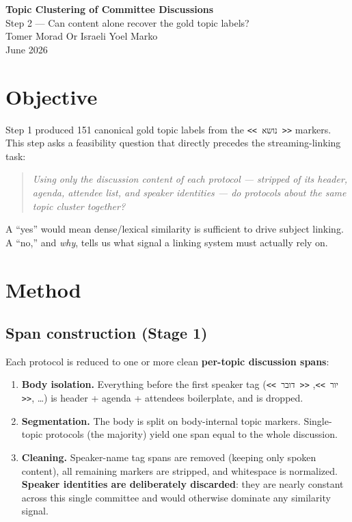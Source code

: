 \documentclass[11pt,a4paper]{article}
\begin{document}
\begin{center}
  {\LARGE \textbf{Topic Clustering of Committee Discussions}}\\[0.3em]
  {\large Step 2 --- Can content alone recover the gold topic labels?}\\[0.6em]
  {\normalsize Tomer Morad \quad Or Israeli \quad Yoel Marko}\\
  {\normalsize June 2026}
\end{center}

\vspace{0.5em}

\section{Objective}

Step 1 produced 151 canonical gold topic labels from the \texttt{<{}< נושא >{}>} markers.
This step asks a feasibility question that directly precedes the streaming-linking task:

\begin{quote}
\emph{Using only the discussion content of each protocol --- stripped of its header, agenda,
attendee list, and speaker identities --- do protocols about the same topic cluster together?}
\end{quote}

A ``yes'' would mean dense/lexical similarity is sufficient to drive subject linking.
A ``no,'' and \emph{why}, tells us what signal a linking system must actually rely on.

\section{Method}

\subsection{Span construction (Stage 1)}

Each protocol is reduced to one or more clean \textbf{per-topic discussion spans}:
\begin{enumerate}[noitemsep]
  \item \textbf{Body isolation.} Everything before the first speaker tag
    (\texttt{<{}< יור >{}>}, \texttt{<{}< דובר >{}>}, \dots) is header + agenda + attendees
    boilerplate, and is dropped.
  \item \textbf{Segmentation.} The body is split on body-internal topic markers. Single-topic
    protocols (the majority) yield one span equal to the whole discussion.
  \item \textbf{Cleaning.} Speaker-name tag spans are removed (keeping only spoken content),
    all remaining markers are stripped, and whitespace is normalized. \textbf{Speaker identities
    are deliberately discarded}: they are nearly constant across this single committee and would
    otherwise dominate any similarity signal.
\end{enumerate}
\end{document}
